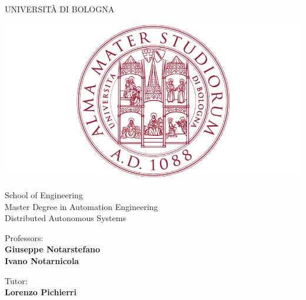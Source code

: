 \documentclass[a4paper,11pt,oneside]{book}
\begin{document}
\pagestyle{myheadings}

\thispagestyle{empty}                                                 
\begin{center}                                                            
    \vspace{5mm}
    {\LARGE UNIVERSIT\`A DI BOLOGNA} \\                       
      \vspace{5mm}
\end{center}
\begin{center}
  \includegraphics[scale=.27]{logo_unibo}
\end{center}
\begin{center}
      \vspace{5mm}
      {\LARGE School of Engineering} \\
        \vspace{3mm}
      {\Large Master Degree in Automation Engineering} \\
      \vspace{20mm}
      {\LARGE Distributed Autonomous Systems} \\
      \vspace{15mm}
\end{center}
\begin{flushleft}                                                                              
     {\large Professors:}\\
     \textbf{\@ Giuseppe Notarstefano} \\
     \textbf{\@ Ivano Notarnicola} \\        
     \vspace{4mm}
	
	{\large Tutor:}\\
	\textbf{\@ Lorenzo Pichierri} \\
     \vspace{8mm}
\end{flushleft}
\end{document}
